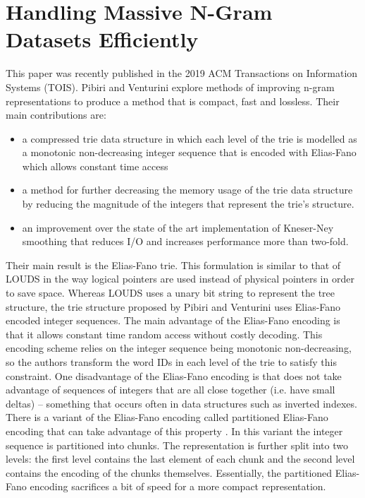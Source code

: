 \documentclass[sigconf, nonacm=true]{acmart}
\begin{document}
\section{Handling Massive N-Gram Datasets Efficiently} \label{sec:new_state_of_the_art}
This paper \cite{pibiri2019handling} was recently published in the 2019 ACM Transactions on Information Systems (TOIS). Pibiri and Venturini explore methods of improving n-gram representations to produce a method that is compact, fast and lossless. Their main contributions are:
\begin{itemize}
    \item a compressed trie data structure in which each level of the trie is modelled as a
monotonic non-decreasing integer sequence that is encoded with Elias-Fano which allows constant time access
    \item a method for further decreasing the memory usage of the trie data structure by reducing the magnitude of the integers that represent the trie's structure.
    \item an improvement over the state of the art implementation of Kneser-Ney smoothing that reduces I/O and increases performance more than two-fold.
\end{itemize}

Their main result is the Elias-Fano trie. This formulation is similar to that of LOUDS in the way logical pointers are used instead of physical pointers in order to save space. Whereas LOUDS uses a unary bit string to represent the tree structure, the trie structure proposed by Pibiri and Venturini uses Elias-Fano encoded \cite{elias1974efficient, fano1971number} integer sequences. The main advantage of the Elias-Fano encoding is that it allows constant time random access without costly decoding. This encoding scheme relies on the integer sequence being monotonic non-decreasing, so the authors transform the word IDs in each level of the trie to satisfy this constraint. One disadvantage of the Elias-Fano encoding is that does not take advantage of sequences of integers that are all close together (i.e. have small deltas) -- something that occurs often in data structures such as inverted indexes. There is a variant of the Elias-Fano encoding called partitioned Elias-Fano encoding that can take advantage of this property \cite{ottaviano2014partitioned}. In this variant the integer sequence is partitioned into chunks. The representation is further split into two levels: the first level contains the last element of each chunk and the second level contains the encoding of the chunks themselves. Essentially, the partitioned Elias-Fano encoding sacrifices a bit of speed for a more compact representation.
\end{document}
